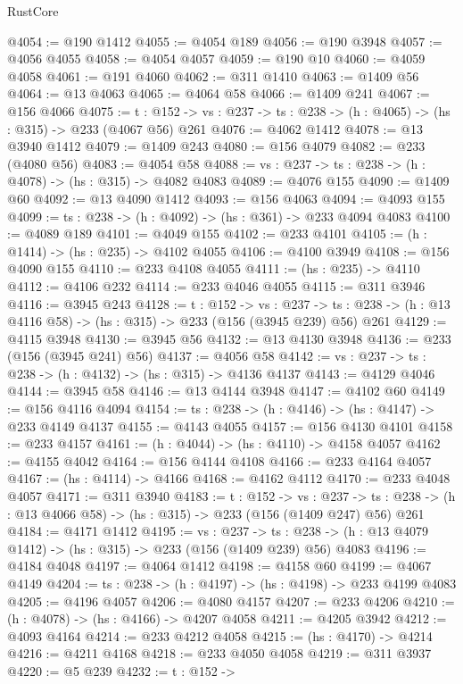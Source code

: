 \begin{lexlean}{RustCore}
\begin{coremodule}
@4054 := @190 @1412
@4055 := @4054 @189
@4056 := @190 @3948
@4057 := @4056 @4055
@4058 := @4054 @4057
@4059 := @190 @10
@4060 := @4059 @4058
@4061 := @191 @4060
@4062 := @311 @1410
@4063 := @1409 @56
@4064 := @13 @4063
@4065 := @4064 @58
@4066 := @1409 @241
@4067 := @156 @4066
@4075 := {t : @152} ->
  {vs : @237} -> {ts : @238} -> (h : @4065) -> (hs : @315) -> @233 (@4067 @56) @261
@4076 := @4062 @1412
@4078 := @13 @3940 @1412
@4079 := @1409 @243
@4080 := @156 @4079
@4082 := @233 (@4080 @56)
@4083 := @4054 @58
@4088 := {vs : @237} -> {ts : @238} -> (h : @4078) -> (hs : @315) -> @4082 @4083
@4089 := @4076 @155
@4090 := @1409 @60
@4092 := @13 @4090 @1412
@4093 := @156 @4063
@4094 := @4093 @155
@4099 := {ts : @238} -> (h : @4092) -> (hs : @361) -> @233 @4094 @4083
@4100 := @4089 @189
@4101 := @4049 @155
@4102 := @233 @4101
@4105 := (h : @1414) -> (hs : @235) -> @4102 @4055
@4106 := @4100 @3949
@4108 := @156 @4090 @155
@4110 := @233 @4108 @4055
@4111 := (hs : @235) -> @4110
@4112 := @4106 @232
@4114 := @233 @4046 @4055
@4115 := @311 @3946
@4116 := @3945 @243
@4128 := {t : @152} ->
  {vs : @237} ->
  {ts : @238} -> (h : @13 @4116 @58) -> (hs : @315) -> @233 (@156 (@3945 @239) @56) @261
@4129 := @4115 @3948
@4130 := @3945 @56
@4132 := @13 @4130 @3948
@4136 := @233 (@156 (@3945 @241) @56)
@4137 := @4056 @58
@4142 := {vs : @237} -> {ts : @238} -> (h : @4132) -> (hs : @315) -> @4136 @4137
@4143 := @4129 @4046
@4144 := @3945 @58
@4146 := @13 @4144 @3948
@4147 := @4102 @60
@4149 := @156 @4116 @4094
@4154 := {ts : @238} -> (h : @4146) -> (hs : @4147) -> @233 @4149 @4137
@4155 := @4143 @4055
@4157 := @156 @4130 @4101
@4158 := @233 @4157
@4161 := (h : @4044) -> (hs : @4110) -> @4158 @4057
@4162 := @4155 @4042
@4164 := @156 @4144 @4108
@4166 := @233 @4164 @4057
@4167 := (hs : @4114) -> @4166
@4168 := @4162 @4112
@4170 := @233 @4048 @4057
@4171 := @311 @3940
@4183 := {t : @152} ->
  {vs : @237} ->
  {ts : @238} -> (h : @13 @4066 @58) -> (hs : @315) -> @233 (@156 (@1409 @247) @56) @261
@4184 := @4171 @1412
@4195 := {vs : @237} ->
  {ts : @238} -> (h : @13 @4079 @1412) -> (hs : @315) -> @233 (@156 (@1409 @239) @56) @4083
@4196 := @4184 @4048
@4197 := @4064 @1412
@4198 := @4158 @60
@4199 := @4067 @4149
@4204 := {ts : @238} -> (h : @4197) -> (hs : @4198) -> @233 @4199 @4083
@4205 := @4196 @4057
@4206 := @4080 @4157
@4207 := @233 @4206
@4210 := (h : @4078) -> (hs : @4166) -> @4207 @4058
@4211 := @4205 @3942
@4212 := @4093 @4164
@4214 := @233 @4212 @4058
@4215 := (hs : @4170) -> @4214
@4216 := @4211 @4168
@4218 := @233 @4050 @4058
@4219 := @311 @3937
@4220 := @5 @239
@4232 := {t : @152} ->

\end{coremodule}
\end{lexlean}
